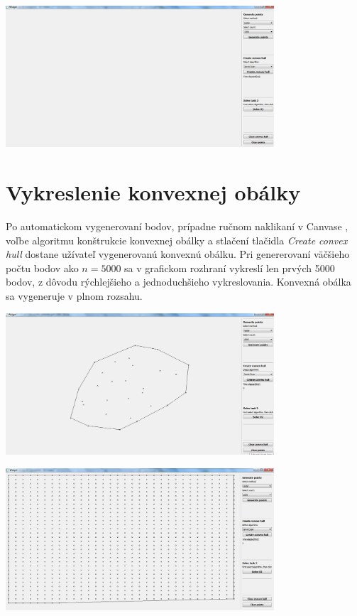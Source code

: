 \documentclass[12pt]{article}
\begin{document}
\begin{center}
   \includegraphics[width=10cm]{./img/ukazka_aplikacia1.png}
\end{center}


\clearpage 
\section{Vykreslenie konvexnej obálky}
Po automatickom vygenerovaní bodov, prípadne ručnom naklikaní v Canvase , voľbe algoritmu konštrukcie konvexnej obálky a stlačení tlačidla \textit{Create convex hull} dostane užívateľ vygenerovanú konvexnú obálku. Pri genererovaní väčšieho počtu bodov ako $ n = 5000 $ sa v grafickom rozhraní vykreslí len prvých 5000 bodov, z dôvodu rýchlejšieho a jednoduchšieho vykreslovania. Konvexná obálka sa vygeneruje v plnom rozsahu.
 
\begin{center}
   \includegraphics[width=10cm]{./img/CH_points_manual.png}
\end{center}

\begin{center}
   \includegraphics[width=10cm]{./img/CH_points_generate_grid_1000.png}
\end{center}
\end{document}
